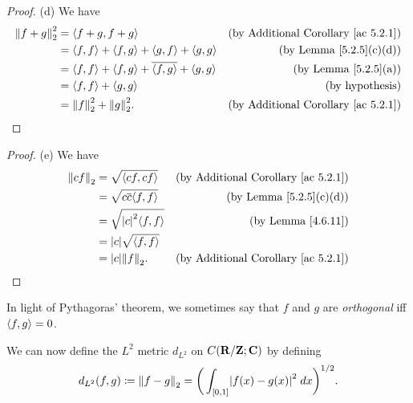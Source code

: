 \begin{proof}{(d)}
    We have
    \begin{align*}
        \norm*{f + g}_2^2 & = \inner*{f + g, f + g}                                                    & \text{(by Additional Corollary \ref{ac 5.2.1})} \\
                          & = \inner*{f, f} + \inner*{f, g} + \inner*{g, f} + \inner*{g, g}            & \text{(by Lemma \ref{5.2.5}(c)(d))}             \\
                          & = \inner*{f, f} + \inner*{f, g} + \overline{\inner*{f, g}} + \inner*{g, g} & \text{(by Lemma \ref{5.2.5}(a))}                \\
                          & = \inner*{f, f} + \inner*{g, g}                                            & \text{(by hypothesis)}                          \\
                          & = \norm*{f}_2^2 + \norm*{g}_2^2.                                           & \text{(by Additional Corollary \ref{ac 5.2.1})}
    \end{align*}
\end{proof}

\begin{proof}{(e)}
    We have
    \begin{align*}
        \norm*{cf}_2 & = \sqrt{\inner*{cf, cf}}              & \text{(by Additional Corollary \ref{ac 5.2.1})} \\
                     & = \sqrt{c \overline{c} \inner*{f, f}} & \text{(by Lemma \ref{5.2.5}(c)(d))}             \\
                     & = \sqrt{\abs{c}^2 \inner*{f, f}}      & \text{(by Lemma \ref{4.6.11})}                  \\
                     & = \abs{c} \sqrt{\inner*{f, f}}                                                          \\
                     & = \abs{c} \norm*{f}_2.                & \text{(by Additional Corollary \ref{ac 5.2.1})}
    \end{align*}
\end{proof}

\begin{note}
    In light of Pythagoras' theorem, we sometimes say that \(f\) and \(g\) are \emph{orthogonal} iff \(\inner*{f, g} = 0\).
\end{note}

\begin{additional corollary}\label{ac 5.2.2}
We can now define the \(L^2\) metric \(d_{L^2}\) on \(C(\R / \Z ; \C)\) by defining
\[
    d_{L^2}(f, g) \coloneqq \norm*{f - g}_2 = \bigg(\int_{[0, 1]} \abs{f(x) - g(x)}^2 \; dx\bigg)^{1 / 2}.
\]
\end{additional corollary}

